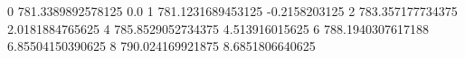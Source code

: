 0 781.3389892578125 0.0
1 781.1231689453125 -0.2158203125
2 783.357177734375 2.0181884765625
4 785.8529052734375 4.513916015625
6 788.1940307617188 6.85504150390625
8 790.024169921875 8.6851806640625
